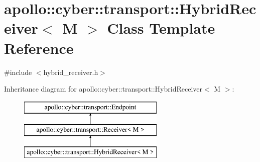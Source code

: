 \hypertarget{classapollo_1_1cyber_1_1transport_1_1HybridReceiver}{\section{apollo\-:\-:cyber\-:\-:transport\-:\-:Hybrid\-Receiver$<$ M $>$ Class Template Reference}
\label{classapollo_1_1cyber_1_1transport_1_1HybridReceiver}
}


{\ttfamily \#include $<$hybrid\-\_\-receiver.\-h$>$}

Inheritance diagram for apollo\-:\-:cyber\-:\-:transport\-:\-:Hybrid\-Receiver$<$ M $>$\-:\begin{figure}[H]
\begin{center}
\leavevmode
\includegraphics[height=3.000000cm]{classapollo_1_1cyber_1_1transport_1_1HybridReceiver}
\end{center}
\end{figure}
